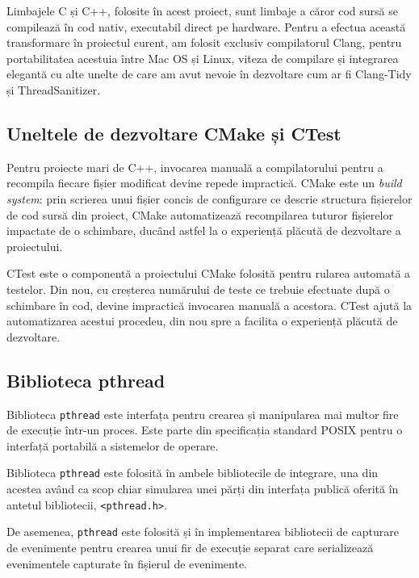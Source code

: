 Limbajele C și C++, folosite în acest proiect, sunt limbaje a căror cod
sursă se compilează în cod nativ, executabil direct pe hardware. Pentru
a efectua această transformare în proiectul curent, am folosit exclusiv
compilatorul Clang\cite{Clang}, pentru portabilitatea acestuia între Mac
OS și Linux, viteza de compilare și integrarea elegantă cu alte unelte
de care am avut nevoie în dezvoltare cum ar fi
Clang-Tidy\cite{ClangTidy} și ThreadSanitizer\cite{ThreadSanitizer}.

\subsection{Uneltele de dezvoltare CMake și CTest}

Pentru proiecte mari de C++, invocarea manuală a compilatorului pentru
a recompila fiecare fișier modificat devine repede impractică.
CMake\cite{CMake} este un \textit{build system}: prin scrierea unui
fișier concis de configurare ce descrie structura fișierelor de cod
sursă din proiect, CMake automatizează recompilarea tuturor fișierelor
impactate de o schimbare, ducând astfel la o experiență plăcută de
dezvoltare a proiectului.

CTest este o componentă a proiectului CMake folosită pentru rularea
automată a testelor. Din nou, cu creșterea numărului de teste ce
trebuie efectuate după o schimbare în cod, devine impractică invocarea
manuală a acestora. CTest ajută la automatizarea acestui procedeu, din
nou spre a facilita o experiență plăcută de dezvoltare.

\subsection{Biblioteca pthread}

Biblioteca \lstinline{pthread}\cite{pthread} este interfața pentru
crearea și manipularea mai multor fire de execuție într-un proces. Este
parte din specificația standard POSIX pentru o interfață portabilă a
sistemelor de operare.

Biblioteca \lstinline{pthread} este folosită în ambele bibliotecile de
integrare, una din acestea având ca scop chiar simularea unei părți din
interfața publică oferită în antetul bibliotecii,
\lstinline{<pthread.h>}.

De asemenea, \lstinline{pthread} este folosită și în implementarea
bibliotecii de capturare de evenimente pentru crearea unui fir de
execuție separat care serializează evenimentele capturate în fișierul de
evenimente.

